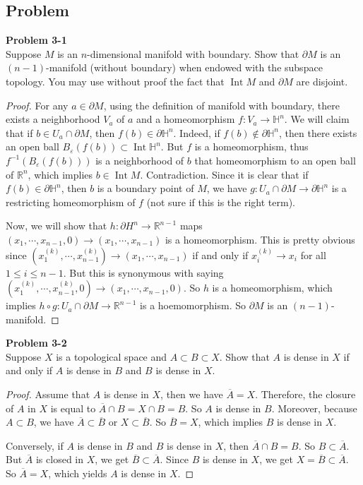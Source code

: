 \documentclass[12pt, a4paper]{article}
\theoremstyle{plain}
\newcommand{\Hs}{\mathbb{H}}
\newcommand{\R}{\mathbb{R}}
\DeclareMathOperator{\inter}{Int}
\def\epsilon{\varepsilon}
\newenvironment{problem}[2][Problem]
    { \begin{mdframed}[backgroundcolor=gray!20] \textbf{#1 #2} \\}
    {  \end{mdframed}}
\begin{document}
\subsection{Problem}

\begin{problem}{3-1}
Suppose $M$ is an $n$-dimensional manifold with boundary. Show that $\partial M$ is an $(n-1)$-manifold (without boundary) when endowed with the subspace topology. You may use without proof the fact that $\inter{M}$ and $\partial M$ are disjoint.
\end{problem}
	\begin{proof}
	For any $a\in \partial M$, using the definition of manifold with boundary, there exists a neighborhood $V_a$ of $a$ and a homeomorphism $f:V_a\rightarrow \Hs^n$. We will claim that if $b\in U_a\cap \partial M$, then $f(b)\in\partial\Hs^n$. Indeed, if $f(b)\notin \partial \Hs^n$, then there exists an open ball $B_\epsilon(f(b))\subset \inter\Hs^n$. But $f$ is a homeomorphism, thus $f^{-1}(B_\epsilon(f(b)))$ is a neighborhood of $b$ that homeomorphism to an open ball of $\R^n$, which implies $b\in \inter{M}$. Contradiction. Since it is clear that if $f(b)\in \partial \Hs^n$, then $b$ is a boundary point of $M$, we have $g:U_a\cap \partial M\rightarrow \partial \Hs^n$ is a restricting homeomorphism of $f$ (not sure if this is the right term).
	
	Now, we will show that $h:\partial H^n\rightarrow \R^{n-1}$ maps $(x_1,\cdots,x_{n-1},0)\rightarrow (x_1,\cdots,x_{n-1})$ is a homeomorphism. This is pretty obvious since $(x_1^{(k)},\cdots,x_{n-1}^{(k)})\rightarrow (x_1,\cdots,x_{n-1})$ if and only if $x_i^{(k)}\rightarrow x_i$ for all $1\leq i\leq n-1$. But this is synonymous with saying $(x_1^{(k)},\cdots,x_{n-1}^{(k)},0)\rightarrow (x_1,\cdots,x_{n-1},0)$. So $h$ is a homeomorphism, which implies $h\circ g: U_a\cap \partial M\rightarrow \R^{n-1}$ is a hoemomorphism. So $\partial M$ is an $(n-1)$-manifold.
	\end{proof}
	
\begin{problem}{3-2}
Suppose $X$ is a topological space and $A\subset B\subset X$. Show that $A$ is dense in $X$ if and only if $A$ is dense in $B$ and $B$ is dense in $X$.
\end{problem}
	\begin{proof}
	Assume that $A$ is dense in $X$, then we have $\overline{A}=X$. Therefore, the closure of $A$ in $X$ is equal to $\overline{A}\cap B=X\cap B=B$. So $A$ is dense in $B$. Moreover, because $A\subset B$, we have $\overline{A}\subset \overline{B}$ or $X\subset\overline{B}$. So $\overline{B}=X$, which implies $B$ is dense in $X$.
	
	Conversely, if $A$ is dense in $B$ and $B$ is dense in $X$, then $\overline{A}\cap B=B$. So $B\subset\overline{A}$. But $\overline{A}$ is closed in $X$, we get $\overline{B}\subset \overline{A}$. Since $B$ is dense in $X$, we get $X=\overline{B}\subset \overline{A}$. So $\overline{A}=X$, which yields $A$ is dense in $X$.
	\end{proof}
\end{document}
